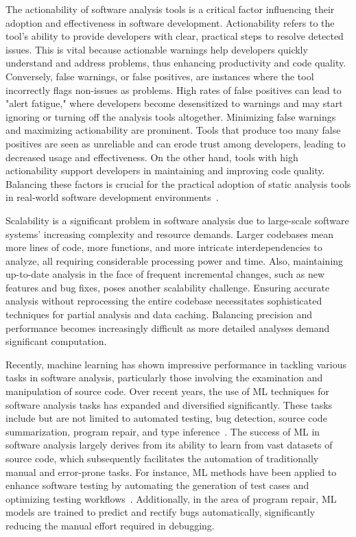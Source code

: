 The actionability of software analysis tools is a critical factor influencing their adoption and effectiveness in software development. Actionability refers to the tool's ability to provide developers with clear, practical steps to resolve detected issues. This is vital because actionable warnings help developers quickly understand and address problems, thus enhancing productivity and code quality. Conversely, false warnings, or false positives, are instances where the tool incorrectly flags non-issues as problems. High rates of false positives can lead to "alert fatigue," where developers become desensitized to warnings and may start ignoring or turning off the analysis tools altogether. Minimizing false warnings and maximizing actionability are prominent. Tools that produce too many false positives are seen as unreliable and can erode trust among developers, leading to decreased usage and effectiveness. On the other hand, tools with high actionability support developers in maintaining and improving code quality. Balancing these factors is crucial for the practical adoption of static analysis tools in real-world software development environments~\cite{christakis2016developers, johnson2013don}.

Scalability is a significant problem in software analysis due to large-scale software systems' increasing complexity and resource demands. Larger codebases mean more lines of code, more functions, and more intricate interdependencies to analyze, all requiring considerable processing power and time. Also, maintaining up-to-date analysis in the face of frequent incremental changes, such as new features and bug fixes, poses another scalability challenge. Ensuring accurate analysis without reprocessing the entire codebase necessitates sophisticated techniques for partial analysis and data caching. Balancing precision and performance becomes increasingly difficult as more detailed analyses demand significant computation. 

Recently, machine learning has shown impressive performance in tackling various tasks in software analysis, particularly those involving the examination and manipulation of source code. Over recent years, the use of ML techniques for software analysis tasks has expanded and diversified significantly. These tasks include but are not limited to automated testing, bug detection, source code summarization, program repair, and type inference~\cite{sharma2024}. The success of ML in software analysis largely derives from its ability to learn from vast datasets of source code, which subsequently facilitates the automation of traditionally manual and error-prone tasks. For instance, ML methods have been applied to enhance software testing by automating the generation of test cases and optimizing testing workflows~\cite{schafer2023empirical}. Additionally, in the area of program repair, ML models are trained to predict and rectify bugs automatically, significantly reducing the manual effort required in debugging.

